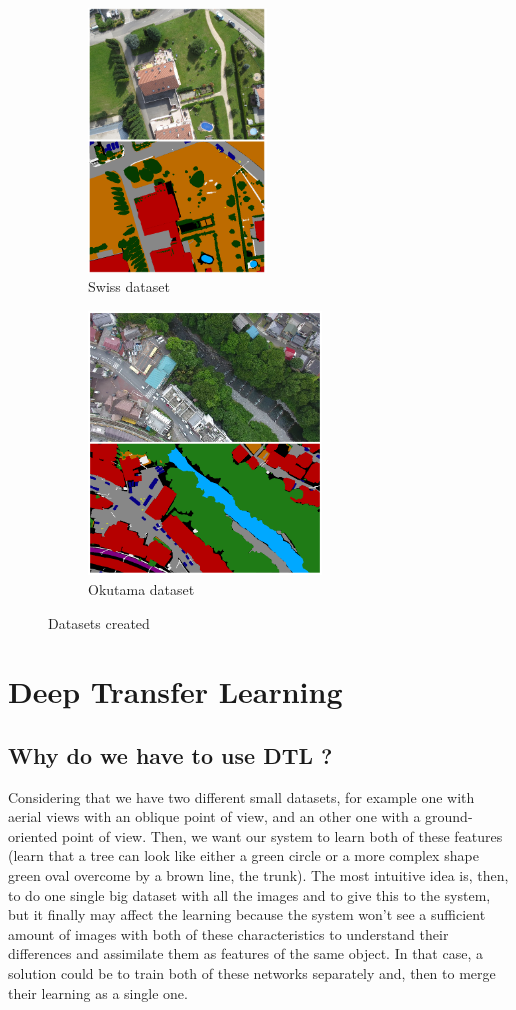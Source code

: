 \begin{figure}[ht!]
\centering
\begin{subfigure}{.5\textwidth}
  \centering
  \includegraphics[height=7cm]{images/part2/swiss_example.png}
  \caption{Swiss dataset}
  \label{fig:part2:swiss_example}
\end{subfigure}%
\begin{subfigure}{.5\textwidth}
  \centering
  \includegraphics[height=7cm]{images/part2/oku_example.png}
  \caption{Okutama dataset}
  \label{fig:part2:oku_example}
\end{subfigure}
\caption{Datasets created}
\label{fig:datasets_example}
\end{figure}



\section{Deep Transfer Learning}
\subsection{Why do we have to use DTL ?}
Considering that we have two different small datasets, for example one with aerial views with an oblique point of view, and an other one with a ground-oriented point of view. Then, we want our system to learn both of these features (learn that a tree can look like either a green circle or a more complex shape green oval overcome by a brown line, the trunk). The most intuitive idea is, then, to do one single big dataset with all the images and to give this to the system, but it finally may affect the learning because the system won't see a sufficient amount of images with both of these characteristics to understand their differences and assimilate them as features of the same object. In that case, a solution could be to train both of these networks separately and, then to merge their learning as a single one.


